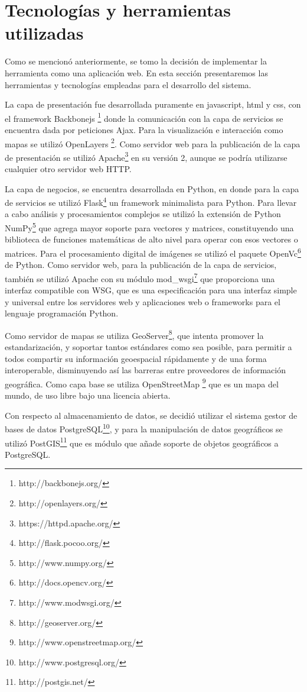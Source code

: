 \section{Tecnologías y herramientas utilizadas}
Como se mencionó anteriormente, se tomo la decisión de implementar la herramienta como una
aplicación web. En esta sección presentaremos las herramientas y tecnologías empleadas para el
desarrollo del sistema.

La capa de presentación fue desarrollada puramente en javascript, html y css, con el framework
Backbonejs \footnote{http://backbonejs.org/} donde la comunicación con la capa de servicios se encuentra dada por peticiones Ajax. Para la visualización e interacción como mapas se utilizó
OpenLayers \footnote{http://openlayers.org/}. Como servidor web para la publicación de la capa de presentación se utilizó Apache\footnote{https://httpd.apache.org/} en su versión 2, aunque se
podría utilizarse cualquier otro servidor web HTTP.

La capa de negocios, se encuentra desarrollada en Python, en donde para la capa de servicios se
utilizó Flask\footnote{http://flask.pocoo.org/} un framework minimalista para Python. Para llevar
a cabo análisis y procesamientos complejos se utilizó la extensión de Python NumPy\footnote{
http://www.numpy.org/} que agrega mayor soporte para vectores y matrices, constituyendo una
biblioteca de funciones matemáticas de alto nivel para operar con esos vectores o matrices. Para
el procesamiento digital de imágenes se utilizó el paquete OpenVc\footnote{http://docs.opencv.org/}
de Python. Como servidor web, para la publicación de la capa de servicios, también se utilizó
Apache con su módulo mod\_wsgi\footnote{http://www.modwsgi.org/} que proporciona una interfaz
compatible con WSG, que es una especificación para una interfaz simple y universal entre los
servidores web y aplicaciones web o frameworks para el lenguaje programación Python.

Como servidor de mapas se utiliza GeoServer\footnote{http://geoserver.org/}, que intenta promover
la estandarización, y soportar tantos estándares como sea posible, para permitir a todos compartir
su información geoespacial rápidamente y de una forma interoperable, disminuyendo así las barreras
entre proveedores de información geográfica. Como capa base se utiliza
OpenStreetMap \footnote{http://www.openstreetmap.org/} que es un mapa del mundo, de uso libre bajo
una licencia abierta.

Con respecto al almacenamiento de datos, se decidió utilizar el sistema gestor de bases de datos
PostgreSQL\footnote{http://www.postgresql.org/}, y para la manipulación de datos geográficos se
utilizó PostGIS\footnote{http://postgis.net/} que es módulo que añade soporte de objetos
geográficos a PostgreSQL.

